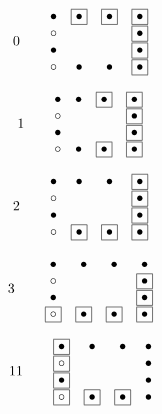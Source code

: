 \documentclass{article}
\begin{document}
\[ 0 \ \ \ \ \
\begin{array}{cccc}
\bullet & \fbox{$\bullet$} & \fbox{$\bullet$} & \fbox{$\bullet$}  \\
\circ   &                      &                      & \fbox{$\bullet$}  \\
\bullet &                      &                      & \fbox{$\bullet$}  \\
\circ    &  \bullet          &   \bullet         & \fbox{$\bullet$}
\end{array}
\]

\[ 1 \ \ \ \ \
\begin{array}{cccc}
\bullet & \bullet          & \fbox{$\bullet$} & \fbox{$\bullet$}  \\
\circ   &                      &                      & \fbox{$\bullet$}  \\
\bullet &                      &                      & \fbox{$\bullet$}  \\
\circ    &  \bullet           & \fbox{$\bullet$} & \fbox{$\bullet$} 
\end{array}
\]

\[ 2 \ \ \ \ \
\begin{array}{cccc}
\bullet & \bullet          &      \bullet     & \fbox{$\bullet$} \\
\circ   &                      &                      & \fbox{$\bullet$}  \\
\bullet &                      &                      & \fbox{$\bullet$}  \\
\circ   & \fbox{$\bullet$} & \fbox{$\bullet$} & \fbox{$\bullet$} 
\end{array}
\]

\[ 3 \ \ \ \ \
\begin{array}{cccc}
\bullet & \bullet                 &            \bullet & \bullet  \\
\circ    &                            &                      & \fbox{$\bullet$}  \\
\bullet &                            &                      & \fbox{$\bullet$}  \\
\fbox{$\circ$} &  \fbox{$\bullet$} & \fbox{$\bullet$} & \fbox{$\bullet$}
\end{array}
\]

\[ 11 \ \ \ \ \
\begin{array}{cccc}
 \fbox{$\bullet$} & \bullet & \bullet & \bullet  \\
\fbox{$\circ$}   &                      &                      & \bullet  \\
 \fbox{$\bullet$} &                      &                      & \bullet  \\
\fbox{$\circ$}    &   \fbox{$\bullet$}          &    \fbox{$\bullet$}   & \bullet
\end{array}
\]
\end{document}
